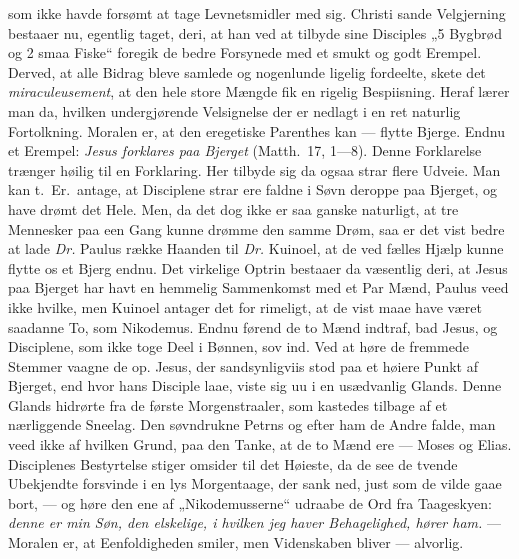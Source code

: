 \documentclass[12pt,a4paper]{book}
\begin{document}
som ikke havde forsømt at tage Levnetsmidler med sig. Christi sande Velgjerning bestaaer nu,
egentlig taget, deri, at han ved at tilbyde sine Disciples „5 Bygbrød og 2 smaa Fiske“
foregik de bedre Forsynede med et smukt og godt Erempel. Derved, at alle Bidrag bleve samlede
og
nogenlunde ligelig fordeelte, skete det \textit{miraculeusement}, at den hele store Mængde
fik en rigelig Bespiisning. Heraf lærer man da, hvilken undergjørende Velsignelse der er
nedlagt i en ret naturlig Fortolkning. Moralen er, at den eregetiske Parenthes kan --- flytte
Bjerge. Endnu et Erempel: \emph{Jesus forklares paa Bjerget} (Matth.\ 17, 1---8). Denne
Forklarelse trænger høilig til en Forklaring. Her tilbyde sig da ogsaa strar flere Udveie.
Man kan t.\ Er.\ antage, at Disciplene strar ere faldne i Søvn deroppe paa Bjerget, og have
drømt det Hele. Men, da det dog ikke er saa ganske naturligt, at tre Mennesker paa een Gang
kunne drømme den samme Drøm, saa er det vist bedre at lade \textit{Dr.} Paulus række Haanden
til \textit{Dr.} Kuinoel, at de ved fælles Hjælp kunne flytte os et Bjerg endnu. Det
virkelige Optrin bestaaer da væsentlig deri, at Jesus paa Bjerget har havt en hemmelig
Sammenkomst med et Par Mænd, Paulus veed ikke hvilke, men Kuinoel antager det for rimeligt,
at de vist maae have været saadanne To, som Nikodemus. Endnu førend de to Mænd indtraf, bad
Jesus, og Disciplene, som ikke toge Deel i Bønnen, sov ind. Ved at høre de fremmede Stemmer
vaagne de op. Jesus, der sandsynligviis stod paa et høiere Punkt af Bjerget, end hvor hans
Disciple laae, viste sig uu i en usædvanlig Glands. Denne Glands hidrørte fra de første
Morgenstraaler, som kastedes tilbage af et nærliggende Sneelag. Den søvndrukne Petrns og
efter ham de Andre falde, man veed ikke af hvilken Grund, paa den Tanke, at de to Mænd ere
--- Moses og Elias. Disciplenes Bestyrtelse stiger omsider til det Høieste, da de see de
tvende Ubekjendte forsvinde i en lys Morgentaage, der sank ned, just som de vilde gaae bort,
--- og høre den ene af „Nikodemusserne“ udraabe de Ord fra Taageskyen: \emph{denne er min
Søn, den elskelige, i hvilken jeg haver Behagelighed, hører ham.} ---
Moralen er, at Eenfoldigheden smiler, men Videnskaben bliver --- alvorlig.
\end{document}
